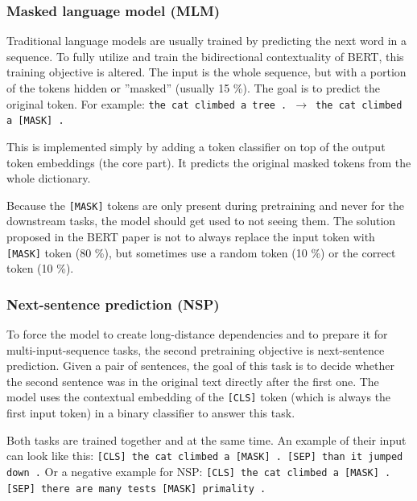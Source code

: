 \documentclass[
  printed, %
  color,   %
  table,   %
  oneside, %
  lof,     %
  lot,     %
]{fithesis3}
\begin{document}
\subsubsection{Masked language model (MLM)}
Traditional language models are usually trained by predicting the next word in a sequence. To fully utilize and train the bidirectional contextuality of BERT, this training objective is altered. The input is the whole sequence, but with a portion of the tokens hidden or ''masked'' (usually 15 \%). The goal is to predict the original token. For example: \texttt{the cat climbed a~tree~.}~$\xrightarrow{}$~\texttt{the cat climbed a [MASK] .}

This is implemented simply by adding a token classifier on top of the output token embeddings (the core part). It predicts the original masked tokens from the whole dictionary.

Because the \texttt{[MASK]} tokens are only present during pretraining and never for the downstream tasks, the model should get used to not seeing them. The solution proposed in the BERT paper \parencite{bert} is not to always replace the input token with \texttt{[MASK]} token (80 \%), but sometimes use a random token (10 \%) or the correct token (10 \%).  

\subsubsection{Next-sentence prediction (NSP)}
\label{sec:nsp}
To force the model to create long-distance dependencies and to prepare it for multi-input-sequence tasks, the second pretraining objective is next-sentence prediction. Given a pair of sentences, the goal of this task is to decide whether the second sentence was in the original text directly after the first one.  The model uses the contextual embedding of the \texttt{[CLS]} token (which is always the first input token) in a binary classifier to answer this task.

\vspace{1em}
{\parindent=0pt
Both tasks are trained together and at the same time. An example of their input can look like this:
}
\newline
{\footnotesize\texttt{[CLS] the cat climbed a [MASK] . [SEP] than it jumped down .}}
\newline
Or a negative example for NSP:
\newline
{\footnotesize\texttt{[CLS] the cat climbed a [MASK] . [SEP] there are many \newline
tests [MASK] primality .}}
\end{document}
